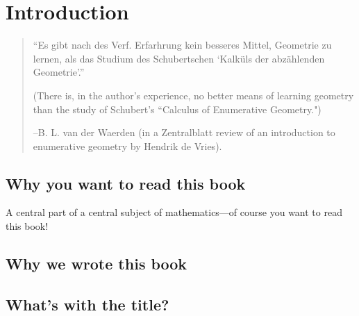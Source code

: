 

\setlength{\parskip}{5pt}

\addtocounter{chapter}{-1}
\chapter{Introduction}
\label{IntroChapter}

\begin{quote}
\small\sf
``Es gibt nach des Verf. Erfarhrung kein besseres Mittel, Geometrie zu lernen, als
das Studium des Schubertschen `Kalk\"uls der abz\"ahlenden Geometrie'.''

(There is, in the author's experience, no better means of learning geometry than
the study of Schubert's ``Calculus of Enumerative Geometry.")

--B. L. van der Waerden (in a Zentralblatt review of an introduction to enumerative geometry
by Hendrik de Vries).
\bigskip

\end{quote}


%


\section{Why you want to read this book}


A central part of a central subject of mathematics---of course you want to read this book! 

\section{Why we wrote this book}


\section{What's with the title?}




